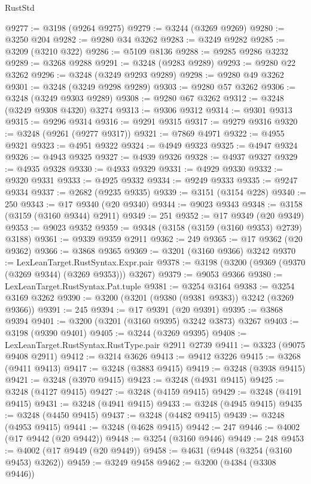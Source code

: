 \begin{lexlean}{RustStd}
\begin{coremodule}
@9277 := @3198 (@9264 @9275)
@9279 := @3244 (@3269 @9269)
@9280 := @3250 @204
@9282 := @9280 @34 @3262
@9283 := @3249 @9282
@9285 := @3209 (@3210 @322)
@9286 := @5109 @8136
@9288 := @9285 @9286 @3232
@9289 := @3268 @9288
@9291 := @3248 (@9283 @9289)
@9293 := @9280 @22 @3262
@9296 := @3248 (@3249 @9293 @9289)
@9298 := @9280 @49 @3262
@9301 := @3248 (@3249 @9298 @9289)
@9303 := @9280 @57 @3262
@9306 := @3248 (@3249 @9303 @9289)
@9308 := @9280 @67 @3262
@9312 := @3248 (@3249 @9308 @4320) @3274
@9313 := @9306 @9312
@9314 := @9301 @9313
@9315 := @9296 @9314
@9316 := @9291 @9315
@9317 := @9279 @9316
@9320 := @3248 (@9261 (@9277 @9317))
@9321 := @7869 @4971
@9322 := @4955 @9321
@9323 := @4951 @9322
@9324 := @4949 @9323
@9325 := @4947 @9324
@9326 := @4943 @9325
@9327 := @4939 @9326
@9328 := @4937 @9327
@9329 := @4935 @9328
@9330 := @4933 @9329
@9331 := @4929 @9330
@9332 := @9320 @9331
@9333 := @4925 @9332
@9334 := @9249 @9333
@9335 := @9247 @9334
@9337 := @2682 (@9235 @9335)
@9339 := @3151 (@3154 @228)
@9340 := 250
@9343 := @17 @9340 (@20 @9340)
@9344 := @9023 @9343
@9348 := @3158 (@3159 (@3160 @9344) @2911)
@9349 := 251
@9352 := @17 @9349 (@20 @9349)
@9353 := @9023 @9352
@9359 := @9348 (@3158 (@3159 (@3160 @9353) @2739) @3188)
@9361 := @9339 @9359 @2911
@9362 := 249
@9365 := @17 @9362 (@20 @9362)
@9366 := @3868 @9365
@9369 := @3201 (@3160 @9366) @3242
@9370 := LexLeanTarget.RustSyntax.Expr.pair
@9378 := @3198 (@3200 (@9369 (@9370 (@3269 @9344) (@3269 @9353))) @3267)
@9379 := @9053 @9366
@9380 := LexLeanTarget.RustSyntax.Pat.tuple
@9381 := @3254 @3164
@9383 := @3254 @3169 @3262
@9390 := @3200 (@3201 (@9380 (@9381 @9383)) @3242 (@3269 @9366))
@9391 := 245
@9394 := @17 @9391 (@20 @9391)
@9395 := @3868 @9394
@9401 := @3200 (@3201 (@3160 @9395) @3242 @3873) @3267
@9403 := @3198 (@9390 @9401)
@9405 := @3244 (@3269 @9395)
@9408 := LexLeanTarget.RustSyntax.RustType.pair @2911 @2739
@9411 := @3323 (@9075 @9408 @2911)
@9412 := @3214 @3626
@9413 := @9412 @3226
@9415 := @3268 (@9411 @9413)
@9417 := @3248 (@3883 @9415)
@9419 := @3248 (@3938 @9415)
@9421 := @3248 (@3970 @9415)
@9423 := @3248 (@4931 @9415)
@9425 := @3248 (@4127 @9415)
@9427 := @3248 (@4159 @9415)
@9429 := @3248 (@4191 @9415)
@9431 := @3248 (@4941 @9415)
@9433 := @3248 (@4945 @9415)
@9435 := @3248 (@4450 @9415)
@9437 := @3248 (@4482 @9415)
@9439 := @3248 (@4953 @9415)
@9441 := @3248 (@4628 @9415)
@9442 := 247
@9446 := @4002 (@17 @9442 (@20 @9442))
@9448 := @3254 (@3160 @9446)
@9449 := 248
@9453 := @4002 (@17 @9449 (@20 @9449))
@9458 := @4631 (@9448 (@3254 (@3160 @9453) @3262))
@9459 := @3249 @9458
@9462 := @3200 (@4384 (@3308 @9446))

\end{coremodule}
\end{lexlean}
